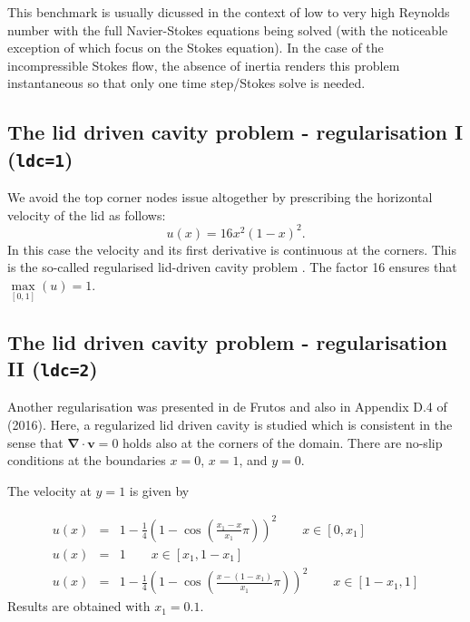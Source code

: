 This benchmark is usually dicussed in the context of low to very high Reynolds number with the full 
Navier-Stokes equations being solved (with the noticeable exception of \cite{sagl81a,sagl81b,chpc95,eid2005}
which focus on the Stokes equation). 
In the case of the incompressible Stokes flow, 
the absence of inertia renders this problem instantaneous so that only one time step/Stokes solve is needed.

\subsection*{The lid driven cavity problem - regularisation I ({\tt ldc=1})}

We avoid the top corner nodes issue altogether by  
prescribing the horizontal velocity of the lid as follows: 
\begin{equation}
u(x)=16x^2(1-x)^2.
\end{equation}
In this case the velocity and its first derivative is continuous at the corners. This is the so-called regularised lid-driven cavity problem \cite{piva94}. The factor 16 ensures that $\max\limits_{[0,1]}(u)=1$.
 
\subsection*{The lid driven cavity problem - regularisation II ({\tt ldc=2})}

Another regularisation was presented in de Frutos \etal \cite{dejn16} and 
also in Appendix D.4 of \textcite{john16} (2016). 
Here, a regularized lid driven cavity is studied which is consistent in the sense that 
${\bm \nabla}\cdot{\bm v}=0$ 
holds also at the corners of the domain.
There are no-slip conditions at the boundaries $x=0$, $x=1$, and $y=0$. 

The velocity at $y=1$ is given by

\begin{eqnarray}
u(x) &=& 1-\frac{1}{4}\left( 1-\cos (\frac{x_1-x}{x_1}\pi)  \right)^2   \quad\quad x\in[0,x_1] \nonumber\\
u(x) &=& 1 \quad\quad x\in[x_1,1-x_1] \nonumber\\
u(x) &=& 1-\frac{1}{4}\left( 1-\cos (\frac{x-(1-x_1)}{x_1}\pi)  \right)^2   \quad\quad x\in[1-x_1,1]
\end{eqnarray}
Results are obtained with $x_1=0.1$.

